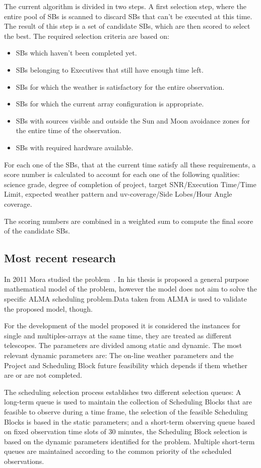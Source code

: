 The current algorithm is divided in two steps. A first selection step, where the entire pool of SBs is scanned to discard SBs that can't be executed at this time. The result of this step is a set of candidate SBs, which are then scored to select the best. The required selection criteria are based on:
\begin{itemize}
\item SBs which haven't been completed yet.
\item SBs belonging to Executives that still have enough time left.
\item SBs for which the weather is satisfactory for the entire observation.
\item SBs for which the current array configuration is appropriate.
\item SBs with sources visible and outside the Sun and Moon avoidance zones for the entire time of the observation.
\item SBs with required hardware available.
\end{itemize}

For each one of the SBs, that at the current time satisfy all these requirements, a score number is calculated to account for each one of the following qualities: science grade, degree of completion of project, target SNR/Execution Time/Time Limit, expected weather pattern and uv-coverage/Side Lobes/Hour Angle coverage.

The scoring numbers are combined in a weighted sum to compute the final score of the
candidate SBs.

\subsection{Most recent research}
In 2011 Mora studied the problem~\cite{mora11}. In his thesis is proposed a general purpose mathematical model of the problem, however the model does not aim to solve the specific ALMA scheduling problem.Data taken from ALMA is used to validate the proposed model, though.

For the development of the model proposed it is considered the instances for single and multiples-arrays at the same time, they are treated as different telescopes. The parameters are divided among static and dynamic. The most relevant dynamic parameters are: The on-line weather parameters and the Project and Scheduling Block future feasibility which depends if them whether are or are not completed.

The scheduling selection process establishes two different selection queues: A long-term queue is used to maintain the collection of Scheduling Blocks that are feasible to observe during a time frame, the selection of the feasible Scheduling Blocks is based in the static parameters; and a short-term observing queue based on fixed observation time slots of 30 minutes, the Scheduling Block selection is based on the dynamic parameters identified for the problem. Multiple short-term queues are maintained according to the common priority of the scheduled observations.

